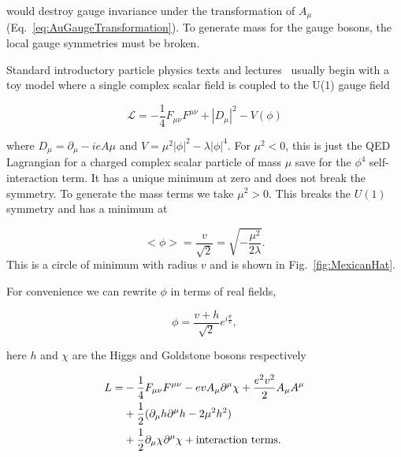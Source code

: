 would destroy gauge invariance under the transformation of $A_{\mu}$(Eq.~\ref{eq:AuGaugeTransformation}). To generate mass for the gauge bosons, the local gauge symmetries must be broken. 

Standard introductory particle physics texts and lectures~\cite{Halzen:1984mc}
usually begin with a toy model where a single complex scalar field is coupled to the U(1) gauge field 

\begin{equation}
    \label{eq:ToyScalarFieldLagrangian}
    \mathcal{L} = -\frac{1}{4} F_{\mu\nu}F^{\mu\nu} + |D_{\mu}|^2 - V(\phi)
\end{equation}


where $D_\mu = \partial_{\mu} - ieA{\mu}$ and $V =\mu^2 |\phi|^2 - \lambda |\phi|^4 $. For $\mu^2 < 0$, this is just the QED Lagrangian for a charged complex scalar particle of mass $\mu$ save for the $\phi^4$ self-interaction term. It has a unique minimum at zero and does not break the symmetry. To generate the mass terms we take $\mu^2 > 0$. This breaks the $U(1)$ symmetry and has a minimum at 

\begin{equation}
    \label{eq:Minimum}
    <\phi> = \frac{v}{\sqrt{2}} = \sqrt{-\frac{\mu^2}{2\lambda}}.
\end{equation}
This is a circle of minimum with radius $v$ and is shown in Fig.~\ref{fig:MexicanHat}. 

For convenience we can rewrite $\phi$ in terms of real fields, 

\begin{equation}
    \label{eq:RealFields}
    \phi = \frac{v+h}{\sqrt{2}}e^{i\frac{\theta}{v}},
\end{equation}

here $h$ and $\chi$ are the Higgs and Goldstone bosons respectively

\begin{align}
\label{eq:HiggsGoldstone}
    L = &-\frac{1}{4} F_{\mu\nu} F^{\mu\nu} - e v A_\mu \partial^\mu \chi + \frac{e^2 v^2}{2} A_\mu A^\mu \nonumber \\
    &+ \frac{1}{2} (\partial_\mu h \partial^\mu h - 2\mu^2 h^2) \nonumber \\
    &+ \frac{1}{2} \partial_\mu \chi \partial^\mu \chi + \textnormal{interaction terms}. \label{eq:HiggsGoldstone}
\end{align}


